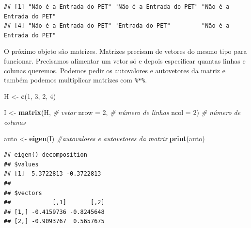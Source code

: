 \documentclass[
]{article}
\newenvironment{Shaded}{\begin{snugshade}}{\end{snugshade}}
\newcommand{\CommentTok}[1]{\textcolor[rgb]{0.56,0.35,0.01}{\textit{#1}}}
\newcommand{\DataTypeTok}[1]{\textcolor[rgb]{0.13,0.29,0.53}{#1}}
\newcommand{\DecValTok}[1]{\textcolor[rgb]{0.00,0.00,0.81}{#1}}
\newcommand{\KeywordTok}[1]{\textcolor[rgb]{0.13,0.29,0.53}{\textbf{#1}}}
\newcommand{\NormalTok}[1]{#1}
\newcommand{\OperatorTok}[1]{\textcolor[rgb]{0.81,0.36,0.00}{\textbf{#1}}}
\newcommand{\StringTok}[1]{\textcolor[rgb]{0.31,0.60,0.02}{#1}}
\begin{document}
\begin{verbatim}
## [1] "Não é a Entrada do PET" "Não é a Entrada do PET" "Não é a Entrada do PET"
## [4] "Não é a Entrada do PET" "Entrada do PET"         "Não é a Entrada do PET"
\end{verbatim}

O próximo objeto são matrizes. Matrizes precisam de vetores do mesmo
tipo para funcionar. Precisamos alimentar um vetor só e depois
especificar quantas linhas e colunas queremos. Podemos pedir os
autovalores e autovetores da matriz e também podemos multiplicar
matrizes com \texttt{\%*\%}.

\begin{Shaded}
\begin{Highlighting}[]
\NormalTok{H <-}\StringTok{ }\KeywordTok{c}\NormalTok{(}\DecValTok{1}\NormalTok{, }\DecValTok{3}\NormalTok{, }\DecValTok{2}\NormalTok{, }\DecValTok{4}\NormalTok{) }

\NormalTok{I <-}\StringTok{ }\KeywordTok{matrix}\NormalTok{(H,        }\CommentTok{# vetor}
           \DataTypeTok{nrow =} \DecValTok{2}\NormalTok{, }\CommentTok{# número de linhas}
           \DataTypeTok{ncol =} \DecValTok{2}\NormalTok{) }\CommentTok{# número de colunas}

\NormalTok{auto <-}\StringTok{ }\KeywordTok{eigen}\NormalTok{(I) }\CommentTok{#autovalores e autovetores da matriz}
\KeywordTok{print}\NormalTok{(auto)}
\end{Highlighting}
\end{Shaded}

\begin{verbatim}
## eigen() decomposition
## $values
## [1]  5.3722813 -0.3722813
## 
## $vectors
##            [,1]       [,2]
## [1,] -0.4159736 -0.8245648
## [2,] -0.9093767  0.5657675
\end{verbatim}

\begin{Shaded}
\end{Shaded}
\end{document}
